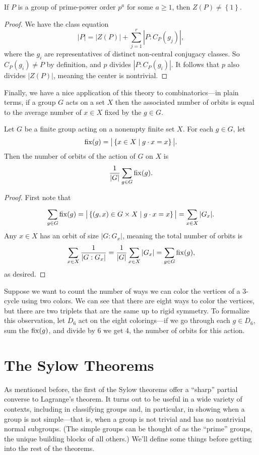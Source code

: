 \documentclass[../m171main.tex]{subfiles}
\begin{document}
\begin{theorem}[]
    If $P$ is a group of prime-power order $p^{a}$ for some $a \geq 1$, then $Z(P) \neq \left\{ 1 \right\}$.
\end{theorem}

\begin{proof}
    We have the class equation
    \[ |P| = |Z(P)| + \sum_{j=1}^{r} | P : C_P(g_j) |, \]
    where the $g_i$ are representatives of distinct non-central conjugacy classes.
    So $C_P(g_i) \neq P$ by definition, and $p$ divides $|P : C_P(g_i)|$.
    It follows that $p$ also divides $|Z(P)|$, meaning the center is nontrivial.
\end{proof}

Finally, we have a nice application of this theory to combinatorics---in plain terms, if a group $G$ acts on a set $X$ then the associated number of orbits is equal to the average number of $x \in X$ fixed by the $g \in G$.

\begin{theorem}   %
    Let $G$ be a finite group acting on a nonempty finite set $X$.
    For each $g \in G$, let
    \[ \operatorname{fix}(g) = \big| \left\{ x \in X \mid g \cdot x = x \right\} \big|. \]
    Then the number of orbits of the action of $G$ on $X$ is
    \[ \frac{1}{|G|} \sum_{g \in G}^{} \operatorname{fix}(g). \]
\end{theorem}

\begin{proof}
    First note that
    \[ \sum_{g \in G}^{} \operatorname{fix}(g) = \big| \left\{ (g,x) \in G \times X \mid g \cdot x = x \right\} \big| = \sum_{x \in X}^{} |G_x|. \]
    Any $x \in X$ has an orbit of size $|G : G_x|$, meaning the total number of orbits is
    \[ \sum_{x \in X}^{} \frac{1}{|G : G_x|} = \frac{1}{|G|} \sum_{x \in X}^{} |G_x| = \sum_{g \in G}^{} \operatorname{fix}(g), \]     %
    as desired.
\end{proof}

Suppose we want to count the number of ways we can color the vertices of a 3-cycle using two colors.
We can see that there are eight ways to color the vertices, but there are two triplets that are the same up to rigid symmetry.
To formalize this observation, let $D_6$ act on the eight colorings---if we go through each $g \in D_6$, sum the $\operatorname{fix}(g)$, and divide by 6 we get 4, the number of orbits for this action.

\section{The Sylow Theorems}
As mentioned before, the first of the Sylow theorems offer a ``sharp'' partial converse to Lagrange's theorem.
It turns out to be useful in a wide variety of contexts, including in classifying groups and, in particular, in showing when a group is not simple---that is, when a group is not trivial and has no nontrivial normal subgroups.
(The simple groups can be thought of as the ``prime'' groups, the unique building blocks of all others.)
We'll define some things before getting into the rest of the theorems.
\end{document}
